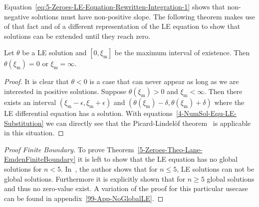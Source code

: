 Equation~\eqref{eq:5-Zeroes-LE-Equation-Rewritten-Integration-1} shows that non-negative solutions must have non-positive slope.
The following theorem makes use of that fact and of a different representation of the \ac{LE} equation to show that solutions can be extended until they reach zero.
\begin{lemma}
	Let $\theta$ be a \ac{LE} solution and $[0,\xi_\textrm{m}]$ be the maximum interval of existence.
	Then $\theta(\xi_\textrm{m})=0$ or $\xi_\textrm{m}=\infty$.
\end{lemma}
\begin{proof}
	It is clear that $\theta<0$ is a case that can never appear as long as we are interested in positive solutions.
	Suppose $\theta(\xi_\textrm{m})>0$ and $\xi_\textrm{m}<\infty$.
	Then there exists an interval $(\xi_\textrm{m}-\epsilon,\xi_\textrm{m}+\epsilon)$ and $(\theta(\xi_\textrm{m})-\delta,\theta(\xi_\textrm{m})+\delta)$ where the \ac{LE} differential equation has a solution.
	With equations~\ref{4-NumSol-Equ-LE-Substitution} we can directly see that the Picard-Lindelöf theorem~\cite{lindelofApplicationMethodeApproximations1894} is applicable in this situation.
\end{proof}
\begin{proof}[Proof  Finite Boundary]
	To prove Theorem~\ref{5-Zeroes-Theo-Lane-EmdenFiniteBoundary} it is left to show that the \ac{LE} equation has no global solutions for $n<5$.
	In~\cite[p.~36]{quittnerSuperlinearParabolicProblems2007}, the author shows that for $n\leq5$, \ac{LE} solutions can not be global solutions.
	Furthermore it is explicitly shown that for $n\geq5$ global solutions and thus no zero-value exist.
	A variation of the proof for this particular usecase can be found in appendix~\ref{99-App-NoGlobalLE}.
\end{proof}
%
%
%
